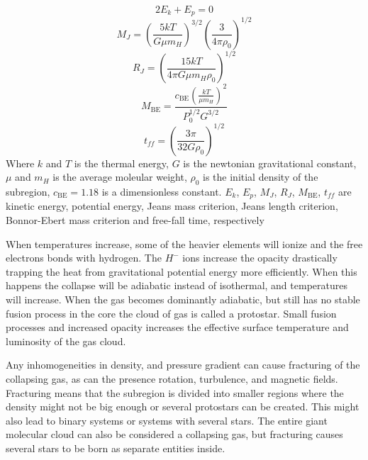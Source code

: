 \begin{minipage}{0.45\textwidth}
  \begin{equation}
    \label{eq:virial-theorem}
    2 E_k + E_p = 0
  \end{equation}
  \begin{equation}
    \label{eq:jeans-mass}
    M_J = \left(\frac{5kT}{G\mu m_H}\right)^{3/2}\left(\frac{3}{4\pi \rho_0}\right)^{1/2}
  \end{equation}  
  \begin{equation}
    \label{eq:jeans-length}
    R_J = \left(\frac{15kT}{4\pi G\mu m_H\rho_0}\right)^{1/2}
  \end{equation}
  \begin{equation}
    \label{eq:bonnor-ebert-mass}
    M_{\scriptscriptstyle \textrm{BE}} = \frac{c_{\scriptscriptstyle \textrm{BE}}\left(\frac{kT}{\mu m_H}\right)^2}{P_0^{1/2}G^{3/2}}
  \end{equation}
  \begin{equation}
    \label{eq:ff-time-collapse}
    t_{ff} = \left(\frac{3\pi}{32G\rho_0}\right)^{1/2}
  \end{equation}
  Where $k$ and $T$ is the thermal energy, $G$ is the newtonian gravitational constant, $\mu$ and $m_H$ is the average moleular weight, $\rho_0$ is the initial density of the subregion, $c_{\scriptscriptstyle \textrm{BE}}=1.18$ is a dimensionless constant.
  $E_k$, $E_p$, $M_J$, $R_J$, $M_{\scriptscriptstyle \textrm{BE}}$, $t_{ff}$ are kinetic energy, potential energy, Jeans mass criterion, Jeans length criterion, Bonnor-Ebert mass criterion and free-fall time, respectively
\end{minipage}

When temperatures increase, some of the heavier elements will ionize and the free electrons bonds with hydrogen. The $H^-$ ions increase the opacity drastically trapping the heat from gravitational potential energy more efficiently.
When this happens the collapse will be adiabatic instead of isothermal, and temperatures will increase.
When the gas becomes dominantly adiabatic, but still has no stable fusion process in the core the cloud of gas is called a protostar.
Small fusion processes and increased opacity increases the effective surface temperature and luminosity of the gas cloud.

Any inhomogeneities in density, and pressure gradient can cause fracturing of the collapsing gas, as can the presence rotation, turbulence, and magnetic fields.
Fracturing means that the subregion is divided into smaller regions where the density might not be big enough or several protostars can be created.
This might also lead to binary systems or systems with several stars.
The entire giant molecular cloud can also be considered a collapsing gas, but fracturing causes several stars to be born as separate entities inside.

